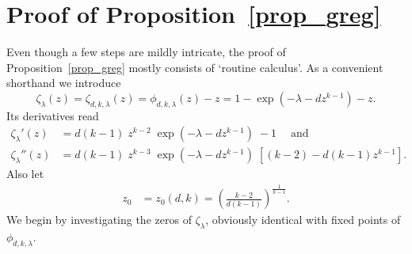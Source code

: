 \documentclass[10pt,reqno]{amsart}
\newcommand\mk[1]{\textcolor{cyan}{#1}}
\renewcommand\mk[1]{#1}
\numberwithin{equation}{section}
\newcommand\bc[1]{\left({#1}\right)}
\newcommand\Prop{Proposition}
\newcommand{\ph}{\phi_{d,k,\lambda}}
\newcommand{\zt}{\zeta_\lambda}
\newcommand{\expld}{\exp(-\lambda-d z^{k-1})}
\begin{document}
\section{Proof of \Prop~\ref{prop_greg}}\label{sec_greg}

\noindent
Even though a few steps are mildly intricate, the proof of \Prop~\ref{prop_greg} mostly consists of `routine calculus'.
As a convenient shorthand we introduce $$\zeta_\lambda(z)=\zeta_{d,k,\lambda}(z)=\phi_{d,k,\lambda}(z)-z = \mk{1-\exp\bc{-\lambda -d z^{k-1}} - z}.$$
Its derivatives read
\begin{align}
\zt'(z)  
 &=d(k-1)  \; z^{k-2} \;  \expld
 \; -1   \;
 \label{zt'}
\quad\text{and} \\
\zt''(z)
&=
  d (k-1) \; z^{k-3} \; \expld \; 
  \left[  (k-2) - d(k-1) z^{k-1} \right] .
\label{zt''}
\end{align}
Also let
\begin{align}\label{inflection}
    z_0 &= z_0(d,k) = \left(\frac{k-2}{d(k-1)}\right)^{\frac{1}{{k-1}}}. 
\end{align}
We begin by investigating the zeros of $\zt$, obviously identical with fixed points of $\ph$.
\end{document}
